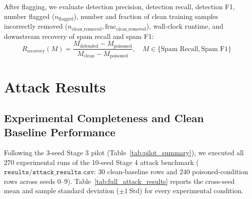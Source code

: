\documentclass[10pt,conference]{IEEEtran}
\begin{document}
After flagging, we evaluate detection precision, detection recall, detection F1, number flagged ($n_{\text{flagged}}$), number and fraction of clean training samples incorrectly removed ($n_{\text{clean\_removed}}, \text{frac}_{\text{clean\_removed}}$), wall-clock runtime, and downstream recovery of spam recall and spam F1:
\begin{equation}
R_{\text{recovery}}(M) = \frac{M_{\text{defended}} - M_{\text{poisoned}}}{M_{\text{clean}} - M_{\text{poisoned}}}, \quad M \in \{\text{Spam Recall}, \text{Spam F1}\}
\end{equation}

\begin{table}[htbp]
\caption{Audited Stage 3 Pilot Summary (Mean $\pm$ Std Across Seeds 0, 1, 2; Generated from $\mathtt{stage3\_pilot\_results.csv}$)}
\label{tab:pilot_summary}
\centering
{}
\end{table}

\section{Attack Results}

\subsection{Experimental Completeness and Clean Baseline Performance}
Following the 3-seed Stage 3 pilot (Table~\ref{tab:pilot_summary}), we executed all $270$ experimental runs of the 10-seed Stage 4 attack benchmark ($\mathtt{results/attack\_results.csv}$: $30$ clean-baseline rows and $240$ poisoned-condition rows across seeds $0$--$9$). Table~\ref{tab:full_attack_results} reports the cross-seed mean and sample standard deviation ($\pm 1\ \text{Std}$) for every experimental condition.
\end{document}
